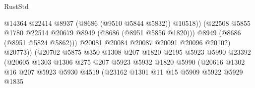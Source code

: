 \begin{lexlean}{RustStd}
\begin{coremodule}
                                              @14364
                                              @22414
                                              @8937
                                              (@8686 (@9510 @5844 @5832))
                                              @10518))
                                          (@22508
                                            @5855
                                            @1780
                                            @22514
                                            @20679
                                            @8949
                                            (@8686 (@8951 @5856 @1820)))
                                          @8949
                                          (@8686 (@8951 @5824 @5862)))
                                        @20081
                                        @20084
                                        @20087
                                        @20091
                                        @20096
                                        @20102)
                                      @20773))
                                  (@20702
                                    @5875
                                    @350
                                    @1308
                                    @207
                                    @1820
                                    @2195
                                    @5923
                                    @5990
                                    @23392
                                    (@20605
                                      @1303
                                      @1306
                                      @275
                                      @207
                                      @5923
                                      @5932
                                      @1820
                                      @5990
                                      (@20616
                                        @1302
                                        @16
                                        @207
                                        @5923
                                        @5930
                                        @4519
                                        (@23162
                                          @1301
                                          @11
                                          @15
                                          @5909
                                          @5922
                                          @5929
                                          @1835

\end{coremodule}
\end{lexlean}
